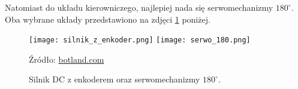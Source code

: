             Natomiast do układu kierowniczego, najlepiej nada się serwomechanizmy $180^\circ$. Oba wybrane układy przedstawiono na zdjęci \ref{fig:engines} poniżej.
            \begin{figure}[!ht]
                \centering
                \texttt{[image: silnik\_z\_enkoder.png]}
                \texttt{[image: serwo\_180.png]}

                \caption{Silnik DC z enkoderem oraz serwomechanizmy $180^\circ$.}
                \footnotesize{Źródło: \href{https://botland.com.pl/}{botland.com}}
                \label{fig:engines}
            \end{figure}

